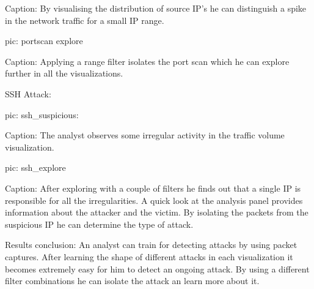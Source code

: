 Caption: By visualising the distribution of source IP's he can distinguish a spike in the network traffic for a small IP range.

pic: portscan explore

Caption: Applying a range filter isolates the port scan which he can explore further in all the visualizations.


SSH Attack:

pic: ssh\_suspicious:

Caption: The analyst observes some irregular activity in the traffic volume visualization.

pic: ssh\_explore

Caption: After exploring with a couple of filters he finds out that a single IP is responsible for all the irregularities. A quick look at the analysis panel provides information about the attacker and the victim. By isolating the packets from the suspicious IP he can determine the type of attack.

Results conclusion:
An analyst can train for detecting attacks by using packet captures. After learning the shape of different attacks in each visualization it becomes extremely easy for him to detect an ongoing attack. By using a different filter combinations he can isolate the attack an learn more about it.


